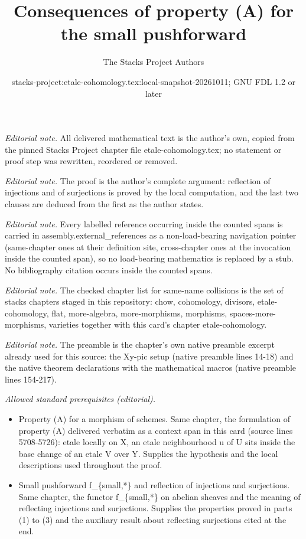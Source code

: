 \documentclass[10pt,a4paper]{amsart}
\title{Consequences of property (A) for the small pushforward}
\author{The Stacks Project Authors}
\date{stacks-project:etale-cohomology.tex:local-snapshot-20261011; GNU FDL 1.2 or later}
\theoremstyle{plain}
\theoremstyle{definition}
\theoremstyle{remark}
\numberwithin{equation}{subsection}
\begin{document}
\maketitle
\noindent\textit{Editorial note.} All delivered mathematical text is the author's own, copied from the pinned Stacks Project chapter file etale-cohomology.tex; no statement or proof step was rewritten, reordered or removed.\par\medskip
\noindent\textit{Editorial note.} The proof is the author's complete argument: reflection of injections and of surjections is proved by the local computation, and the last two clauses are deduced from the first as the author states.\par\medskip
\noindent\textit{Editorial note.} Every labelled reference occurring inside the counted spans is carried in assembly.external\_references as a non-load-bearing navigation pointer (same-chapter ones at their definition site, cross-chapter ones at the invocation inside the counted span), so no load-bearing mathematics is replaced by a stub. No bibliography citation occurs inside the counted spans.\par\medskip
\noindent\textit{Editorial note.} The checked chapter list for same-name collisions is the set of stacks chapters staged in this repository: chow, cohomology, divisors, etale-cohomology, flat, more-algebra, more-morphisms, morphisms, spaces-more-morphisms, varieties together with this card's chapter etale-cohomology.\par\medskip
\noindent\textit{Editorial note.} The preamble is the chapter's own native preamble excerpt already used for this source: the Xy-pic setup (native preamble lines 14-18) and the native theorem declarations with the mathematical macros (native preamble lines 154-217).\par\medskip
\noindent\textit{Allowed standard prerequisites (editorial).}\begin{itemize}
\item Property (A) for a morphism of schemes. Same chapter, the formulation of property (A) delivered verbatim as a context span in this card (source lines 5708-5726): etale locally on X, an etale neighbourhood u of U sits inside the base change of an etale V over Y. Supplies the hypothesis and the local descriptions used throughout the proof.
\item Small pushforward f\_\{small,*\} and reflection of injections and surjections. Same chapter, the functor f\_\{small,*\} on abelian sheaves and the meaning of reflecting injections and surjections. Supplies the properties proved in parts (1) to (3) and the auxiliary result about reflecting surjections cited at the end.
\end{itemize}\medskip
\end{document}
